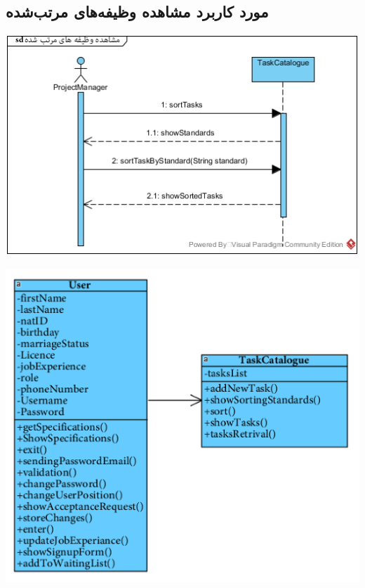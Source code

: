 \newpage
\vspace{2cm}
\subsection*{مورد کاربرد مشاهده وظیفه‌های مرتب‌شده}
\vspace{2cm}
\begin{center}
\includegraphics[width=\textwidth]{SequenceDiagrams/20.jpg}
\end{center}

\newpage
\vspace{2cm}
\begin{center}
\includegraphics[width=\textwidth]{SequenceClasses/20.png}
\end{center}

